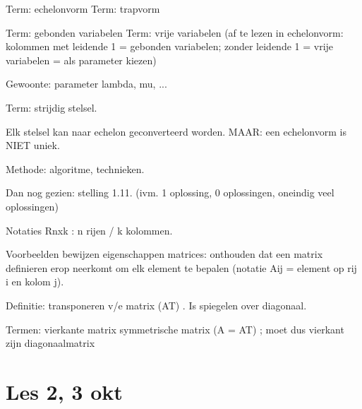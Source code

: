 \documentclass{article}
\begin{document}
Term: echelonvorm
Term: trapvorm

Term: gebonden variabelen
Term: vrije variabelen
(af te lezen in echelonvorm: kolommen met leidende 1 = gebonden variabelen; zonder leidende 1 = vrije variabelen = als parameter kiezen)

Gewoonte: parameter lambda, mu, ... 

Term: strijdig stelsel. 

Elk stelsel kan naar echelon geconverteerd worden. 
MAAR: een echelonvorm is NIET uniek. 

Methode: algoritme, technieken. 

Dan nog gezien: stelling 1.11. (ivm. 1 oplossing, 0 oplossingen, oneindig veel oplossingen)

Notaties Rnxk  : n rijen / k kolommen. 

Voorbeelden bewijzen eigenschappen matrices: onthouden dat een matrix definieren erop neerkomt om elk element te bepalen (notatie Aij = element op rij i en kolom j). 

Definitie: transponeren v/e matrix (AT) . Is spiegelen over diagonaal. 

Termen: 
vierkante matrix
symmetrische matrix (A = AT) ; moet dus vierkant zijn 
diagonaalmatrix



\section{Les 2, 3 okt}
\end{document}
